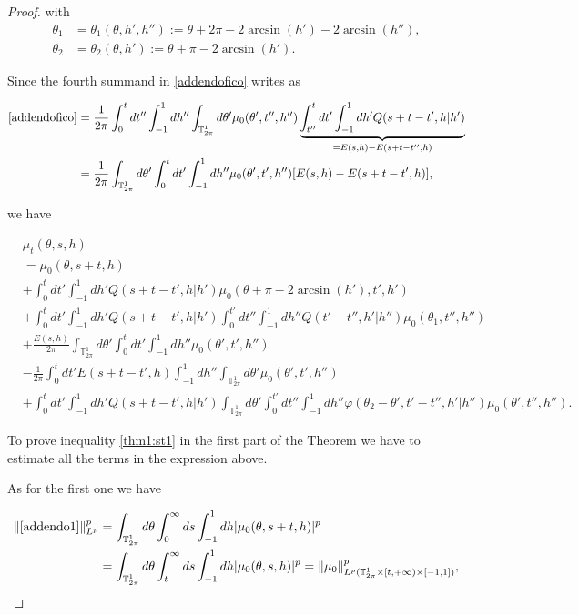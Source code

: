 \documentclass[a4paper,10pt,reqno]{amsart}
\numberwithin{equation}{subsection}
\numberwithin{figure}{subsection}
\begin{document}
\begin{proof}
with
\begin{align*}
\theta_1&=\theta_1(\theta,h',h''):=\theta+2\pi-2\arcsin(h')-2\arcsin(h''),
\\
\theta_2&=\theta_2(\theta,h'):=\theta+\pi-2\arcsin(h').
\end{align*}

Since the fourth summand in \eqref{addendofico} writes as

\begin{align*}
\eqref{addendofico}&=\frac{1}{2\pi}\int_0^tdt''\int_{-1}^1dh''\int_{\mathbb{T}^1_{2\pi}}d\theta'\mu_0(\theta',t'',h'')\underbrace{\int_{t''}^tdt'\int_{-1}^1dh'Q(s+t-t',h|h')}_{=E(s,h)-E(s+t-t'',h)}
\\
&=\frac{1}{2\pi}\int_{\mathbb{T}^1_{2\pi}}d\theta'\int_0^tdt'\int_{-1}^1dh''\mu_0(\theta',t',h'')[E(s,h)-E(s+t-t',h)],
\end{align*}

 we have
 
{\scriptsize\begin{align}
\nonumber&\mu_t(\theta,s,h)
\\
\label{addendo1}&=\mu_0(\theta,s+t,h)
\\
\label{addendo2}&+\int_0^tdt'\int_{-1}^1dh'Q(s+t-t',h|h')\mu_0(\theta+\pi-2\arcsin(h'),t',h')
\\
\label{addendo3}&+\int_0^tdt'\int_{-1}^1dh'Q(s+t-t',h|h')\int_0^{t'}dt''\int_{-1}^1dh''Q(t'-t'',h'|h'')\mu_0(\theta_1,t'',h'')
\\
\label{addendo4}&+\frac{E(s,h)}{2\pi}\int_{\mathbb{T}^1_{2\pi}}d\theta'\int_0^tdt'\int_{-1}^1dh''\mu_0(\theta',t',h'')
\\
\label{addendo5}&-\frac{1}{2\pi}\int_0^tdt' E(s+t-t',h)\int_{-1}^1dh''\int_{\mathbb{T}^1_{2\pi}}d\theta'\mu_0(\theta',t',h'')
\\
\label{addendo6}&+\int_0^tdt'\int_{-1}^1dh'Q(s+t-t',h|h')\int_{\mathbb{T}^1_{2\pi}}d\theta'\int_0^{t'}dt''\int_{-1}^1dh''\varphi(\theta_2-\theta',t'-t'',h'|h'')\mu_0(\theta',t'',h'').
\end{align}}

To prove inequality \eqref {thm1:st1} in the first part of the Theorem we have to estimate all the terms in the expression above.

As for the first one we have

\begin{align*}
\|\eqref{addendo1}\|_{L^p}^p&=\int_{\mathbb{T}^1_{2\pi}}d\theta\int_0^{\infty}ds\int_{-1}^1dh|\mu_0(\theta,s+t,h)|^p
\\
&=\int_{\mathbb{T}^1_{2\pi}}d\theta\int_t^{\infty}ds\int_{-1}^1dh|\mu_0(\theta,s,h)|^p=\|\mu_0\|_{L^p(\mathbb{T}^1_{2\pi}\times[t,+\infty)\times[-1,1])}^p,
\end{align*}


\end{proof}
\end{document}
